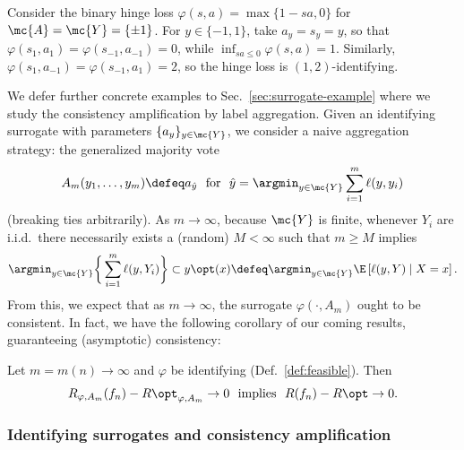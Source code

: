 \documentclass[11pt]{article}
\newcommand{\tloss}{\ell}  %
\newcommand{\sloss}{\varphi}  %
\begin{document}
\begin{example}
  Consider the binary hinge loss $\sloss(s,a) = \max \{1 - sa, 0\}$ for
  $\mc{A} = \mc{Y} = \{\pm 1\}$.
  For $y \in \{-1, 1\}$, take $a_y = s_y = y$, so that
  $\sloss(s_1, a_1) = \sloss(s_{-1}, a_{-1}) = 0$, while $\inf_{sa \le 0}
  \sloss(s, a) = 1$.
  Similarly, $\sloss(s_1, a_{-1}) = \sloss(s_{-1}, a_1) = 2$, so the hinge
  loss is $(1, 2)$-identifying.
\end{example}

We defer further concrete examples to Sec.~\ref{sec:surrogate-example} where we study the consistency amplification by label aggregation. Given an identifying surrogate with parameters $\{a_y\}_{y \in \mc{Y}}$, we
consider a naive aggregation strategy: the generalized majority vote
\begin{equation}
  \label{eqn:naive-mv-aggregation}
  A_m(y_1, \ldots, y_m) \defeq a_{\hat{y}}
  ~~ \mbox{for} ~~
  \hat{y} = \argmin_{y \in \mc{Y}}
  \sum_{i = 1}^m \tloss(y, y_i)
\end{equation}
(breaking ties arbitrarily).
%
As $m \to \infty$, because $\mc{Y}$ is finite, whenever
$Y_i$ are i.i.d.\ there necessarily exists a (random) $M < \infty$ such
that $m \ge M$ implies
\begin{equation*}
  \argmin_{y \in \mc{Y}}\bigg\{ \sum_{i = 1}^m \tloss(y, Y_i)\bigg\}
  \subset y\opt(x) \defeq \argmin_{y \in \mc{Y}}
  \E\left[\tloss(y, Y) \mid X = x\right].
\end{equation*}
From this, we expect that as $m \to \infty$, the
surrogate $\sloss(\cdot, A_m)$ ought to be consistent.
%
In fact, we have the following corollary of our coming results,
guaranteeing (asymptotic) consistency:
\begin{corollary}
  \label{corollary:always-consistent}
  Let $m = m(n) \to \infty$
  and $\sloss$ be identifying (Def.~\ref{def:feasible}).
  Then
  \begin{equation*}
    R_{\sloss,A_m}(f_n) - R\opt_{\sloss, A_m} \to 0
    ~~ \mbox{implies} ~~
    R(f_n) - R\opt \to 0.
  \end{equation*}
\end{corollary}

\subsubsection{Identifying surrogates and consistency amplification}
\end{document}
